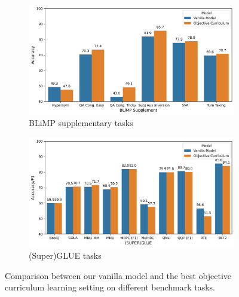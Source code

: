 \begin{figure}[h]
\centering
\begin{subfigure}[b]{0.48\textwidth}
    \centering
    \includegraphics[width=\textwidth]{chapters/climb/figures/baseline_vs_obj_cl_blimp_supp_new.png}
    \caption{BLiMP supplementary tasks}
    \label{fig:baseline_obj_cl_blimp_supp}
\end{subfigure}
\hfill
\begin{subfigure}[b]{0.48\textwidth}
    \centering
    \includegraphics[width=\textwidth]{chapters/climb/figures/baseline_vs_obj_cl_superglue.png}
    \caption{(Super)GLUE tasks}
    \label{fig:baseline_obj_cl_superglue}
\end{subfigure}
\caption{Comparison between our vanilla model and the best objective curriculum learning setting on different benchmark tasks.}
\label{fig:baseline_obj_cl_comparison}
\end{figure}


